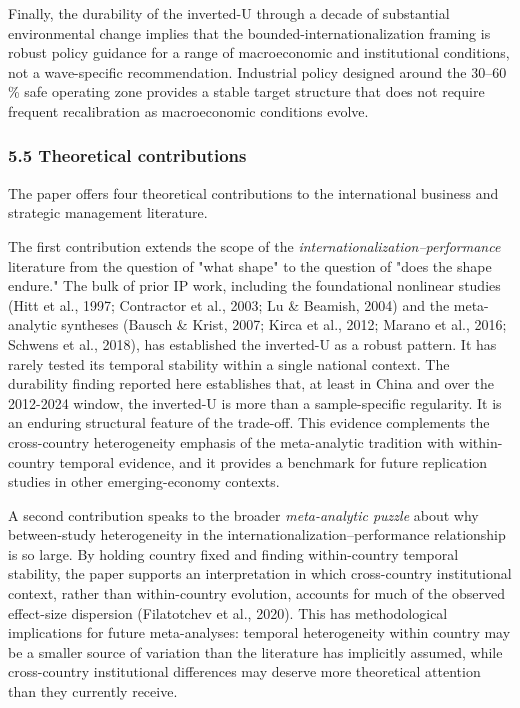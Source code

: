 \documentclass[12pt,a4paper]{article}
\begin{document}
Finally, the durability of the inverted-U through a decade of
substantial environmental change implies that the
bounded-internationalization framing is robust policy guidance for a
range of macroeconomic and institutional conditions, not a wave-specific
recommendation. Industrial policy designed around the 30--60 \% safe
operating zone provides a stable target structure that does not require
frequent recalibration as macroeconomic conditions evolve.

\hypertarget{55-theoretical-contributions}{%
\subsubsection{5.5 Theoretical
contributions}\label{55-theoretical-contributions}}

The paper offers four theoretical contributions to the international
business and strategic management literature.

The first contribution extends the scope of the
\emph{internationalization--performance} literature from the question of
"what shape" to the question of "does the shape endure." The bulk of
prior IP work, including the foundational nonlinear studies (Hitt et
al., 1997; Contractor et al., 2003; Lu \& Beamish, 2004) and the
meta-analytic syntheses (Bausch \& Krist, 2007; Kirca et al., 2012;
Marano et al., 2016; Schwens et al., 2018), has established the
inverted-U as a robust pattern. It has rarely tested its temporal
stability within a single national context. The durability finding
reported here establishes that, at least in China and over the 2012-2024
window, the inverted-U is more than a sample-specific regularity. It is
an enduring structural feature of the trade-off. This evidence
complements the cross-country heterogeneity emphasis of the
meta-analytic tradition with within-country temporal evidence, and it
provides a benchmark for future replication studies in other
emerging-economy contexts.

A second contribution speaks to the broader \emph{meta-analytic puzzle}
about why between-study heterogeneity in the
internationalization--performance relationship is so large. By holding
country fixed and finding within-country temporal stability, the paper
supports an interpretation in which cross-country institutional context,
rather than within-country evolution, accounts for much of the observed
effect-size dispersion (Filatotchev et al., 2020). This has
methodological implications for future meta-analyses: temporal
heterogeneity within country may be a smaller source of variation than
the literature has implicitly assumed, while cross-country institutional
differences may deserve more theoretical attention than they currently
receive.
\end{document}
